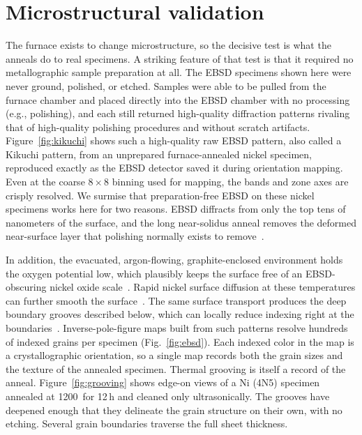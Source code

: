\documentclass[%
 aip,
 rsi,%
 amsmath,amssymb,
 reprint,%
]{revtex4-2}
\begin{document}
\section{Microstructural validation}

The furnace exists to change microstructure, so the decisive test is what
the anneals do to real specimens. A striking feature of that test is that it
required no metallographic sample preparation at all. The EBSD specimens
shown here were never ground, polished, or etched. Samples were able to be pulled from the furnace chamber and placed
directly into the EBSD chamber with no processing (e.g., polishing), and each still returned high-quality
diffraction patterns rivaling that of high-quality polishing procedures and without scratch artifacts.
Figure~\ref{fig:kikuchi} shows such a high-quality raw EBSD pattern, also
called a Kikuchi
pattern, from an unprepared furnace-annealed nickel specimen,
reproduced exactly as the EBSD detector saved it during orientation mapping.
Even at the coarse $8\times8$ binning used for mapping, the bands and zone
axes are crisply resolved. We surmise that preparation-free EBSD on these nickel specimens works here for two reasons.
EBSD diffracts from only the top tens of nanometers of the surface, and the
long near-solidus anneal removes the deformed near-surface layer that
polishing normally exists to
remove~\cite{goldstein2018characterizingcrystallinematerials}.

In addition,
the evacuated, argon-flowing, graphite-enclosed environment holds the oxygen
potential low, which plausibly keeps the surface free of an EBSD-obscuring
nickel oxide scale~\cite{wolf2021thermodynamicassessmentof}. Rapid nickel
surface diffusion at these temperatures can further smooth the
surface~\cite{maiya1967surfaceselfdiffusion,thompson2012solidstatedewettingof}.
The same surface transport produces the deep boundary grooves described
below, which can locally reduce indexing right at the
boundaries~\cite{gladstone2001grainboundarymisorientation}.
Inverse-pole-figure maps built
from such patterns resolve hundreds of indexed grains per specimen
(Fig.~\ref{fig:ebsd}). Each indexed color in the map is a crystallographic
orientation, so a single map records both the grain sizes and the texture of
the annealed specimen. Thermal
grooving is itself a record of the anneal. Figure~\ref{fig:grooving} shows
edge-on views of a Ni (4N5) specimen annealed at 1200\,\celsius{} for 12\,h and
cleaned only ultrasonically. The grooves have deepened enough that they
delineate the grain structure on their own, with no etching. Several grain
boundaries traverse the full sheet thickness.
\end{document}
